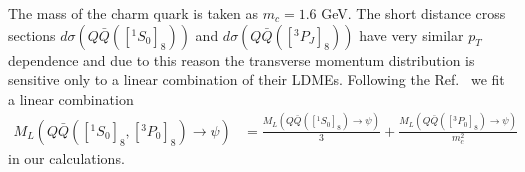 \documentclass[12pt,a4paper,final]{iopart}
\newcommand{\barQ}{{\bar{Q}}}
\begin{document}
The mass of the charm quark is taken as $m_{c}=1.6$ GeV. The short distance cross 
sections $d\sigma(Q\barQ([^1S_0]_{8}))$ and $d\sigma(Q\barQ([^3P_J]_{8}))$ have
very similar $p_{T}$ dependence and due to this reason the transverse momentum distribution 
is sensitive only to a linear combination of their LDMEs.
Following the Ref.~\cite{Cho:1995vh,Beneke:1996yw} we fit a linear combination 
\begin{equation}
  \begin{split}
    M_{L}(Q\barQ([^1S_0]_{8},[^3P_0]_{8})\rightarrow \psi)&= \frac{M_{L}(Q\barQ([^1S_0]_{8})\rightarrow \psi)}{3} + \frac{M_{L}(Q\barQ([^3P_0]_{8})\rightarrow \psi)}{m_{c}^{2}} \nonumber
  \end{split}
\end{equation}
in our calculations.


\end{document}
